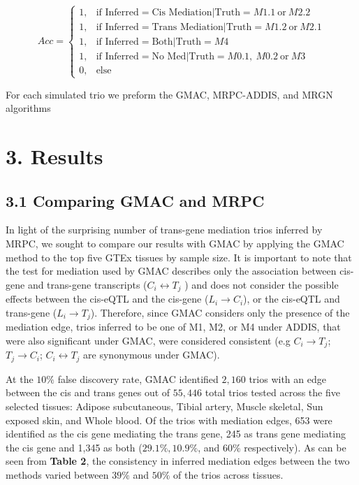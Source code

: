 \documentclass[
]{article}
\begin{document}
\[ Acc = \begin{cases} 1, & \text{if Inferred} = \text{Cis Mediation} | \text{Truth} = M1.1 \ \text{or} \ M2.2  \\
                       1, & \text{if Inferred} = \text{Trans Mediation} | \text{Truth} = M1.2 \ \text{or} \ M2.1 \\
                       1, & \text{if Inferred} = \text{Both} | \text{Truth} = M4 \\
                       1, & \text{if Inferred} = \text{No Med} | \text{Truth} = M0.1, \ M0.2 \ \text{or} \ M3  \\
                       0, & \text{else}
                       \end{cases} \]

For each simulated trio we preform the GMAC, MRPC-ADDIS, and MRGN
algorithms

\section*{3. Results}
\subsection*{3.1 Comparing GMAC and MRPC}

In light of the surprising number of trans-gene mediation trios inferred
by MRPC, we sought to compare our results with GMAC by applying the GMAC
method to the top five GTEx tissues by sample size. It is important to
note that the test for mediation used by GMAC describes only the
association between cis-gene and trans-gene transcripts
(\(C_i \leftrightarrow T_j\) ) and does not consider the possible
effects between the cis-eQTL and the cis-gene (\(L_i \rightarrow C_i\)),
or the cis-eQTL and trans-gene (\(L_i \rightarrow T_j\)). Therefore,
since GMAC considers only the presence of the mediation edge, trios
inferred to be one of M1, M2, or M4 under ADDIS, that were also
significant under GMAC, were considered consistent (e.g
\(C_i \rightarrow T_j\); \(T_j \rightarrow C_i\);
\(C_i \leftrightarrow T_j\) are synonymous under GMAC).

At the \(10\%\) false discovery rate, GMAC identified \(2,160\) trios
with an edge between the cis and trans genes out of \(55,446\) total
trios tested across the five selected tissues: Adipose subcutaneous,
Tibial artery, Muscle skeletal, Sun exposed skin, and Whole blood. Of
the trios with mediation edges, 653 were identified as the cis gene
mediating the trans gene, 245 as trans gene mediating the cis gene and
1,345 as both (\(29.1\%, 10.9\%\), and \(60\%\) respectively). As can be
seen from \textbf{Table 2}, the consistency in inferred mediation edges
between the two methods varied between \(39\%\) and \(50\%\) of the
trios across tissues.
\end{document}

